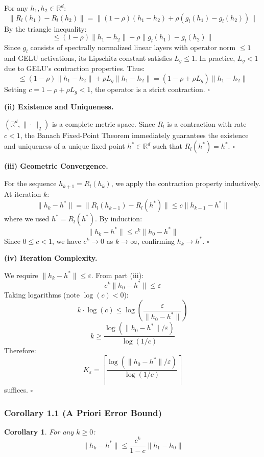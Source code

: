 \documentclass[11pt,a4paper]{article}
\newtheorem{corollary}{Corollary}[theorem]
\theoremstyle{definition}
\begin{document}
For any $h_1, h_2 \in \mathbb{R}^d$:
\[ \|R_l(h_1) - R_l(h_2)\| = \|(1-\rho)(h_1 - h_2) + \rho(g_l(h_1) - g_l(h_2))\| \]
By the triangle inequality:
\[ \leq (1-\rho)\|h_1 - h_2\| + \rho\|g_l(h_1) - g_l(h_2)\| \]
Since $g_l$ consists of spectrally normalized linear layers with operator norm $\leq 1$ and GELU activations, its Lipschitz constant satisfies $L_g \leq 1$. In practice, $L_g < 1$ due to GELU's contraction properties. Thus:
\[ \leq (1-\rho)\|h_1 - h_2\| + \rho L_g \|h_1 - h_2\| = (1 - \rho + \rho L_g)\|h_1 - h_2\| \]
Setting $c = 1 - \rho + \rho L_g < 1$, the operator is a strict contraction. \hfill$\square$

\vspace{0.5em}
\noindent\textbf{(ii) Existence and Uniqueness.}

$(\mathbb{R}^d, \|\cdot\|_2)$ is a complete metric space. Since $R_l$ is a contraction with rate $c < 1$, the Banach Fixed-Point Theorem immediately guarantees the existence and uniqueness of a unique fixed point $h^* \in \mathbb{R}^d$ such that $R_l(h^*) = h^*$. \hfill$\square$

\vspace{0.5em}
\noindent\textbf{(iii) Geometric Convergence.}

For the sequence $h_{k+1} = R_l(h_k)$, we apply the contraction property inductively. At iteration $k$:
\[ \|h_k - h^*\| = \|R_l(h_{k-1}) - R_l(h^*)\| \leq c \|h_{k-1} - h^*\| \]
where we used $h^* = R_l(h^*)$. By induction:
\[ \|h_k - h^*\| \leq c^k \|h_0 - h^*\| \]
Since $0 \leq c < 1$, we have $c^k \to 0$ as $k \to \infty$, confirming $h_k \to h^*$. \hfill$\square$

\vspace{0.5em}
\noindent\textbf{(iv) Iteration Complexity.}

We require $\|h_k - h^*\| \leq \varepsilon$. From part (iii):
\[ c^k \|h_0 - h^*\| \leq \varepsilon \]
Taking logarithms (note $\log(c) < 0$):
\[ k \cdot \log(c) \leq \log\left(\frac{\varepsilon}{\|h_0 - h^*\|}\right) \]
\[ k \geq \frac{\log(\|h_0 - h^*\| / \varepsilon)}{\log(1/c)} \]
Therefore:
\[ K_\varepsilon = \left\lceil \frac{\log(\|h_0 - h^*\| / \varepsilon)}{\log(1/c)} \right\rceil \]
suffices. \hfill$\square$

\subsubsection{Corollary 1.1 (A Priori Error Bound)}
\begin{corollary}
For any $k \geq 0$:
\[ \|h_k - h^*\| \leq \frac{c^k}{1 - c} \|h_1 - h_0\| \]
\end{corollary}
\end{document}
